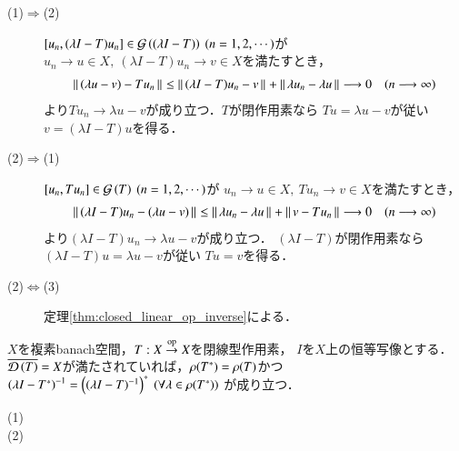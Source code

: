 	\begin{prf}\mbox{}
		\begin{description}
			\item[(1)$\Rightarrow$(2)]
				$[u_n,(\lambda I - T) u_n] \in \Graph{(\lambda I - T)} \ (n=1,2,\cdots)$が
				$u_n \longrightarrow u \in X,\ (\lambda I - T) u_n \longrightarrow v \in X$を満たすとき，
				\begin{align}
					\left\|\, (\lambda u - v) - T u_n\, \right\|_{}
					\leq \left\|\, (\lambda I - T) u_n - v\, \right\|_{} + \left\|\, \lambda u_n - \lambda u\, \right\|_{}
					\longrightarrow 0 \quad (n \longrightarrow \infty)
				\end{align}
				より$T u_n \longrightarrow \lambda u - v$が成り立つ．$T$が閉作用素なら
				$T u = \lambda u - v$が従い$v = (\lambda I - T) u$を得る．
				
			\item[(2)$\Rightarrow$(1)]
				$[u_n,T u_n] \in \Graph{T} \ (n=1,2,\cdots)$が
				$u_n \longrightarrow u \in X,\ T u_n \longrightarrow v \in X$を満たすとき，
				\begin{align}
					\left\|\, (\lambda I - T)u_n - (\lambda u - v)\, \right\|_{}
					\leq \left\|\, \lambda u_n - \lambda u\, \right\|_{} + \left\|\, v - T u_n\, \right\|_{}
					\longrightarrow 0 \quad (n \longrightarrow \infty)
				\end{align}
				より$(\lambda I - T)u_n \longrightarrow \lambda u - v$が成り立つ．
				$(\lambda I - T)$が閉作用素なら$(\lambda I - T)u = \lambda u - v$が従い
				$T u = v$を得る．
				
			\item[(2)$\Leftrightarrow$(3)]
				定理\ref{thm:closed_linear_op_inverse}による．
				\QED
		\end{description}
	\end{prf}
	
	\begin{screen}
		\begin{thm}[レゾルベントの共役]
			$X$を複素banach空間，$T:X \overset{\mathrm{op}}{\rightarrow} X$を閉線型作用素，
			$I$を$X$上の恒等写像とする．$\closure{\Dom{T} } = X$が満たされていれば，$\mathfrak{\rho} (T^*) = \mathfrak{\rho} (T) $かつ
			$\left( \lambda I - T^* \right)^{-1} = \left((\lambda I - T)^{-1}\right)^*\ (\forall \lambda \in \mathfrak{\rho} (T^*))$
			が成り立つ．
		\end{thm}
	\end{screen}
	
	\begin{prf}\mbox{}
		\begin{description}
			\item[(1)]
				
			\item[(2)]
		\end{description}
	\end{prf}
	
